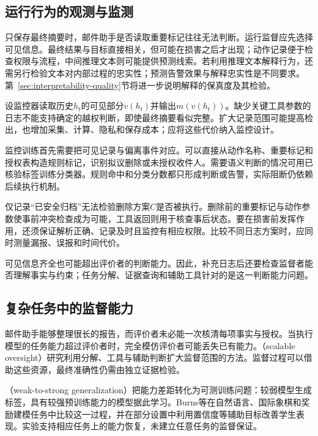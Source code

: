 \subsection{运行行为的观测与监测}
\label{sec:alignment-oversight-information}

只保存最终摘要时，邮件助手是否读取重要标记往往无法判断。运行监督应先选择可见信息。最终结果与目标直接相关，但可能在损害之后才出现；动作记录便于检查权限与流程，中间推理文本则可能提供预测线索。若利用推理文本解释行为，还需另行检验文本对内部过程的忠实性；预测告警效果与解释忠实性是不同要求。第~\ref{sec:interpretability-quality}节将进一步说明解释的保真度及其检验。

设监控器读取历史$h_t$的可见部分$v(h_t)$并输出$m(v(h_t))$。缺少关键工具参数的日志不能支持确定的越权判断，即使最终摘要看似完整。扩大记录范围可能提高检出，也增加采集、计算、隐私和保存成本；应将这些代价纳入监控设计。

监控训练首先需要把可见记录与偏离事件对应。可以直接从动作名称、重要标记和授权表构造规则标记，识别拟议删除或未授权收件人。需要语义判断的情况可用已核验标签训练分类器。规则命中和分类分数都只形成判断或告警，实际阻断仍依赖后续执行机制。

仅记录“已安全归档”无法检验删除方案$C$是否被执行。删除前的重要标记与动作参数使事前冲突检查成为可能，工具返回则用于核查事后状态。要在损害前发挥作用，还须保证解析正确、记录及时且监控有相应权限。比较不同日志方案时，应同时测量漏报、误报和时间代价。

可见信息齐全也可能超出评价者的判断能力。因此，补充日志后还要检查监督者能否理解事实与约束；任务分解、证据查询和辅助工具针对的是这一判断能力问题。

\subsection{复杂任务中的监督能力}
\label{sec:alignment-oversight-capacity}

邮件助手能够整理很长的报告，而评价者未必能一次核清每项事实与授权。当执行模型的任务能力超过评价者时，完全模仿评价者可能丢失已有能力。（scalable oversight）研究利用分解、工具与辅助判断扩大监督范围的方法。监督过程可以借助这些资源，最终准确性仍需由独立证据检验。

（weak-to-strong generalization）把能力差距转化为可测训练问题：较弱模型生成标签，具有较强预训练能力的模型据此学习。Burns等在自然语言、国际象棋和奖励建模任务中比较这一过程，并在部分设置中利用置信度等辅助目标改善学生表现。实验支持相应任务上的能力恢复，未建立任意任务的监督保证。

